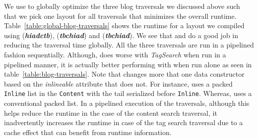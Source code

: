 We use \system to globally optimize the three blog traversals we discussed above such that we pick one layout for all traversals that minimizes the overall runtime. Table~\ref{table:global-blog-traversals} shows the runtime for a layout we compiled using \gibbon (\textit{\textbf{hiadctb}}), \systemSolver(\textit{\textbf{tbchiad}}) 
and \systemGreedy(\textit{\textbf{tbchiad}}). We see that \systemGreedy and \systemSolver do a good job in reducing the traversal time globally. 
All the three traversals are run in a pipelined fashion sequentially. Although, \systemSolver does worse with \textit{TagSearch} when run in a pipelined manner, 
it is actually better performing with \systemSolver when run alone as seen in table~\ref{table:blog-traversals}. 
Note that \systemSolver changes more that one data constructor based on the \textit{inlineable} attribute that \systemGreedy does not.
For instance, \systemSolver uses a packed \lstinline|Inline| list in the \lstinline|Content| with the tail serialized before \lstinline|Inline|.
Whereas, \systemGreedy uses a conventional packed list. In a pipelined execution of the traversals, although this helps reduce the runtime in the case 
of the content search traversal, it inadvertently increases the runtime in case of the tag search traversal due to a cache effect
that can benefit from runtime information.

